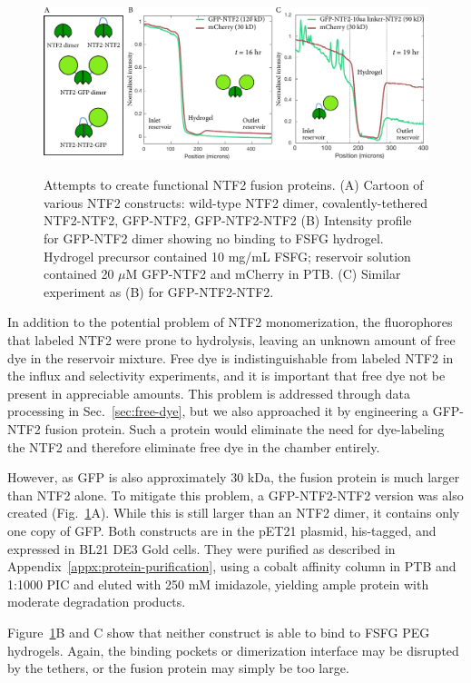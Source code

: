 \begin{figure} %
\caption[NTF2 fusion proteins.]{Attempts to create functional NTF2 fusion proteins. (A) Cartoon of various NTF2 constructs: wild-type NTF2 dimer, covalently-tethered NTF2-NTF2, GFP-NTF2, GFP-NTF2-NTF2 (B) Intensity profile for GFP-NTF2 dimer showing no binding to FSFG hydrogel.  Hydrogel precursor contained 10 mg/mL FSFG; reservoir solution contained 20 $\mu$M GFP-NTF2 and mCherry in PTB.  (C) Similar experiment as (B) for GFP-NTF2-NTF2.}
\centering
\includegraphics[width=\textwidth]{figs/ch03/NTF2-constructs}
\label{fig:NTF2}
\end{figure}

In addition to the potential problem of NTF2 monomerization, the fluorophores that labeled NTF2 were prone to hydrolysis, leaving an unknown amount of free dye in the reservoir mixture.  Free dye is indistinguishable from labeled NTF2 in the influx and selectivity experiments, and it is important that  free dye not be present in appreciable amounts.  This problem is addressed through data processing in Sec.~\ref{sec:free-dye}, but we also approached it by engineering a GFP-NTF2 fusion protein.  Such a protein would eliminate the need for dye-labeling the NTF2 and therefore eliminate free dye in the chamber entirely.  

However, as GFP is also approximately 30 kDa, the fusion protein is much larger than NTF2 alone.  To mitigate this problem, a GFP-NTF2-NTF2 version was also created (Fig.~\ref{fig:NTF2}A).  While this is still larger than an NTF2 dimer, it contains only one copy of GFP.  Both constructs are in the pET21 plasmid, his-tagged, and expressed in BL21 DE3 Gold cells.  They were purified as described in Appendix~\ref{appx:protein-purification}, using a cobalt affinity column in PTB  and 1:1000 PIC and eluted with 250 mM imidazole, yielding ample protein with moderate degradation products.

Figure~\ref{fig:NTF2}B and C show that neither construct is able to bind to FSFG PEG hydrogels.  Again, the binding pockets or dimerization interface may be disrupted by the tethers, or the fusion protein may simply be too large.

